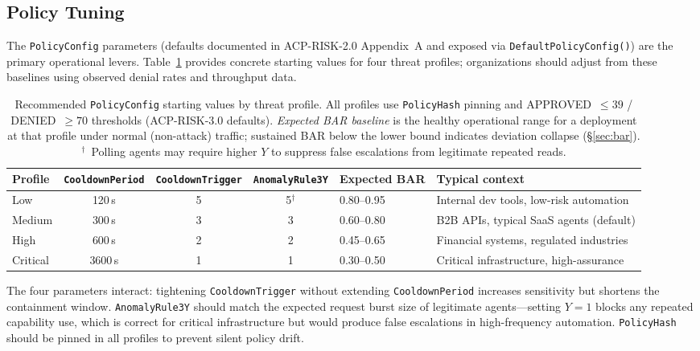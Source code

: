 \documentclass[11pt]{article}
\theoremstyle{definition}
\begin{document}
\subsection{Policy Tuning}

The \texttt{PolicyConfig} parameters (defaults documented in ACP-RISK-2.0 Appendix~A
and exposed via \texttt{DefaultPolicyConfig()}) are the primary operational levers.
Table~\ref{tab:policy-profiles} provides concrete starting values for four
threat profiles; organizations should adjust from these baselines using
observed denial rates and throughput data.

\begin{table}[h!]
\centering\small
\caption{Recommended \texttt{PolicyConfig} starting values by threat profile.
All profiles use \texttt{PolicyHash} pinning and APPROVED~$\leq 39$ / DENIED~$\geq 70$
thresholds (ACP-RISK-3.0 defaults).
\emph{Expected BAR baseline} is the healthy operational range for a deployment at that
profile under normal (non-attack) traffic; sustained BAR below the lower bound indicates
deviation collapse (\S\ref{sec:bar}).
$^\dagger$~Polling agents may require higher $Y$ to suppress false escalations
from legitimate repeated reads.}
\label{tab:policy-profiles}
\begin{tabular}{@{}lcccp{2.0cm}p{3.5cm}@{}}
\toprule
Profile & \texttt{CooldownPeriod} & \texttt{CooldownTrigger} & \texttt{AnomalyRule3Y} & Expected BAR & Typical context \\
\midrule
Low      & 120\,s  & 5 & 5$^\dagger$ & 0.80--0.95 & Internal dev tools, low-risk automation \\
Medium   & 300\,s  & 3 & 3           & 0.60--0.80 & B2B APIs, typical SaaS agents (default) \\
High     & 600\,s  & 2 & 2           & 0.45--0.65 & Financial systems, regulated industries \\
Critical & 3600\,s & 1 & 1           & 0.30--0.50 & Critical infrastructure, high-assurance \\
\bottomrule
\end{tabular}
\end{table}

\noindent The four parameters interact: tightening \texttt{CooldownTrigger} without
extending \texttt{CooldownPeriod} increases sensitivity but shortens the containment
window. \texttt{AnomalyRule3Y} should match the expected request burst size of
legitimate agents---setting $Y=1$ blocks any repeated capability use, which is
correct for critical infrastructure but would produce false escalations in
high-frequency automation. \texttt{PolicyHash} should be pinned in all profiles
to prevent silent policy drift.
\end{document}
